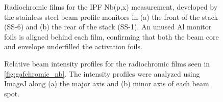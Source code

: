     



\begin{figure}
    \centering
    \caption{Radiochromic films for the IPF Nb(p,x) measurement, developed by the stainless steel beam profile monitors in (a) the front of the stack (SS-6) and (b) the rear of the stack (SS-1). An unused Al monitor foils is aligned behind each film, confirming that both the beam core and envelope underfilled the activation foils.}
     \label{fig:gafchromic_nb}
\end{figure}




\begin{figure}
    \centering
    \caption{Relative beam intensity profiles for the radiochromic films seen in \autoref{fig:gafchromic_nb}. The intensity profiles were analyzed using ImageJ along (a) the major axis and (b) minor axis of each beam spot. }
     \label{fig:gafchromic_nb_profiles}
\end{figure}




